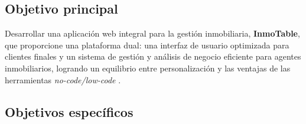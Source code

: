 \subsection{Objetivo principal}


Desarrollar una aplicación web integral para la gestión inmobiliaria, \textbf{InmoTable}, que proporcione una plataforma dual: una interfaz de usuario optimizada para clientes finales y un sistema de gestión y análisis de negocio eficiente para agentes inmobiliarios, logrando un equilibrio entre personalización y las ventajas de las herramientas \textit{no-code/low-code} \cite{ionos2024lowcode}.


\subsection{Objetivos específicos}



